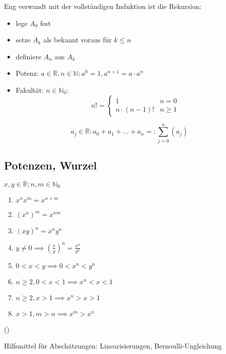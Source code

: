 Eng verwandt mit der vollständigen Induktion ist die Rekursion:
\begin{itemize}
 \item lege $A_0$ fest
 \item setze $A_k$ als bekannt voraus für $k \leq n$
 \item definiere $A_n$ aus $A_k$
\end{itemize}

\begin{example}[Standard]
  \begin{itemize}
    \item Potenz: $a \in \mathbb{R}, n \in \mathbb{N}: a^0 = 1, a^{n+1} = a\cdot a^n$
    \item Fakultät: $n \in \mathbb{N}_0:$
    \begin{equation*} n! = \begin{cases} 1 & n = 0 \\ n \cdot (n-1)! & n \geq 1 \end{cases} \end{equation*}
  \end{itemize}
\end{example}

\begin{definition}[Summensymbol]
  \begin{equation*} a_j \in \mathbb{R}: a_0 + a_1 + \ldots + a_n =: \sum_{j=0}^{n} \left( a_j \right) \end{equation*}
\end{definition}

\subsection{Potenzen, Wurzel}

\begin{theorem}\flush
  $x,y \in \mathbb{R}; n,m \in \mathbb{N}_0$
  \begin{enumerate}
   \item $x^nx^m = x^{n+m}$
   \item $(x^n)^m = x^{nm}$
   \item $(xy)^n = x^ny^n$
   \item $y \neq 0 \implies \left(\frac x y\right)^n = \frac{x^n}{y^n}$
   \item $0 < x < y \implies 0 < x^n < y^n$
   \item $n \geq 2, 0<x<1 \implies x^n<x<1$
   \item $n \geq 2, x > 1 \implies x^n>x>1$
   \item $x > 1, m > n \implies x^m > x^n$
  \end{enumerate}
  (\induction)
\end{theorem}
%
\noindent Hilfsmittel für Abschätzungen: Linearisierungen, Bernoulli-Ungleichung

